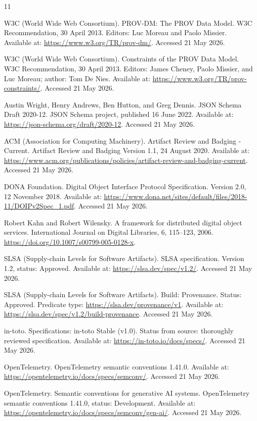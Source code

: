 \documentclass[11pt]{article}
\begin{document}
\begin{thebibliography}{11}

W3C (World Wide Web Consortium). PROV-DM: The PROV Data Model. W3C
Recommendation, 30 April 2013. Editors: Luc Moreau and Paolo Missier.
Available at: \url{https://www.w3.org/TR/prov-dm/}. Accessed 21 May 2026.

W3C (World Wide Web Consortium). Constraints of the PROV Data Model. W3C
Recommendation, 30 April 2013. Editors: James Cheney, Paolo Missier, and Luc
Moreau; author: Tom De Nies. Available at:
\url{https://www.w3.org/TR/prov-constraints/}. Accessed 21 May 2026.

Austin Wright, Henry Andrews, Ben Hutton, and Greg Dennis. JSON Schema Draft
2020-12. JSON Schema project, published 16 June 2022. Available at:
\url{https://json-schema.org/draft/2020-12}. Accessed 21 May 2026.

ACM (Association for Computing Machinery). Artifact Review and Badging -
Current. Artifact Review and Badging Version 1.1, 24 August 2020. Available
at: \url{https://www.acm.org/publications/policies/artifact-review-and-badging-current}.
Accessed 21 May 2026.

DONA Foundation. Digital Object Interface Protocol Specification. Version 2.0,
12 November 2018. Available at:
\url{https://www.dona.net/sites/default/files/2018-11/DOIPv2Spec_1.pdf}.
Accessed 21 May 2026.

Robert Kahn and Robert Wilensky. A framework for distributed digital object
services. International Journal on Digital Libraries, 6, 115--123, 2006.
\url{https://doi.org/10.1007/s00799-005-0128-x}.

SLSA (Supply-chain Levels for Software Artifacts). SLSA specification. Version
1.2, status: Approved. Available at: \url{https://slsa.dev/spec/v1.2/}.
Accessed 21 May 2026.

SLSA (Supply-chain Levels for Software Artifacts). Build: Provenance. Status:
Approved. Predicate type: \url{https://slsa.dev/provenance/v1}. Available at:
\url{https://slsa.dev/spec/v1.2/build-provenance}. Accessed 21 May 2026.

in-toto. Specifications: in-toto Stable (v1.0). Status from source:
thoroughly reviewed specification. Available at:
\url{https://in-toto.io/docs/specs/}. Accessed 21 May 2026.

OpenTelemetry. OpenTelemetry semantic conventions 1.41.0. Available at:
\url{https://opentelemetry.io/docs/specs/semconv/}. Accessed 21 May 2026.

OpenTelemetry. Semantic conventions for generative AI systems. OpenTelemetry
semantic conventions 1.41.0, status: Development. Available at:
\url{https://opentelemetry.io/docs/specs/semconv/gen-ai/}. Accessed 21 May
2026.

\end{thebibliography}
\end{document}

